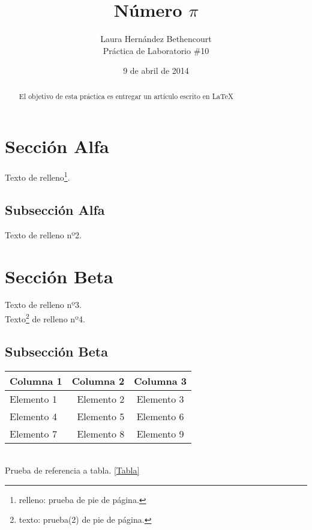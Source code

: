 \documentclass[spanish,a4paper,10pt]{article}
\begin{document}
\title{Número $\pi$}
\author{Laura Hernández Bethencourt \\ Práctica de Laboratorio \#10}
\date{9 de abril de 2014}

\maketitle

\begin{abstract}
El objetivo de esta práctica es entregar un artículo escrito en \LaTeX{}
\end{abstract}

\section{Sección Alfa}
Texto de relleno\footnote{relleno: prueba de pie de página.}.

\subsection{Subsección Alfa}
Texto de relleno nº2.

\section{Sección Beta}
Texto de relleno nº3. \\
Texto\footnote{texto: prueba(2) de pie de página.} de relleno nº4.

\subsection{Subsección Beta}
\begin{Tabla}
\begin{tabular}{lrc}
\hline Columna 1  & Columna 2 & Columna 3  \\ \hline
Elemento 1 & Elemento 2 & Elemento 3 \\ 
Elemento 4 & Elemento 5 & Elemento 6 \\ 
Elemento 7 & Elemento 8 & Elemento 9 \\ 
\end{tabular}
\end{Tabla}
\\Prueba de referencia a tabla. \ref{Tabla}

\end{document}
